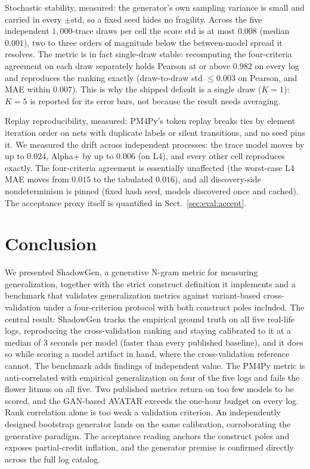 \documentclass[runningheads]{llncs}
\begin{document}
Stochastic stability, measured: the generator's own sampling variance is small and carried in every $\pm$std, so a fixed seed hides no fragility. Across the five independent $1{,}000$-trace draws per cell the score std is at most $0.008$ (median $0.001$), two to three orders of magnitude below the between-model spread it resolves. The metric is in fact single-draw stable: recomputing the four-criteria agreement on each draw separately holds Pearson at or above $0.982$ on every log and reproduces the ranking exactly (draw-to-draw std $\le0.003$ on Pearson, and MAE within $0.007$). This is why the shipped default is a single draw ($K{=}1$): $K{=}5$ is reported for its error bars, not because the result needs averaging.

Replay reproducibility, measured: PM4Py's token replay breaks ties by element iteration order on nets with duplicate labels or silent transitions, and no seed pins it. We measured the drift across independent processes: the trace model moves by up to $0.024$, Alpha+ by up to $0.006$ (on L4), and every other cell reproduces exactly. The four-criteria agreement is essentially unaffected (the worst-case L4 MAE moves from $0.015$ to the tabulated $0.016$), and all discovery-side nondeterminism is pinned (fixed hash seed, models discovered once and cached). The acceptance proxy itself is quantified in Sect.~\ref{sec:eval:accept}.

\section{Conclusion}
\label{sec:conclusion}

We presented ShadowGen, a generative N-gram metric for measuring generalization, together with the strict construct definition it implements and a benchmark that validates generalization metrics against variant-based cross-validation under a four-criterion protocol with both construct poles included. The central result: ShadowGen tracks the empirical ground truth on all five real-life logs, reproducing the cross-validation ranking and staying calibrated to it at a median of $3$ seconds per model (faster than every published baseline), and it does so while scoring a model artifact in hand, where the cross-validation reference cannot. The benchmark adds findings of independent value. The PM4Py metric is anti-correlated with empirical generalization on four of the five logs and fails the flower litmus on all five. Two published metrics return on too few models to be scored, and the GAN-based AVATAR exceeds the one-hour budget on every log. Rank correlation alone is too weak a validation criterion. An independently designed bootstrap generator lands on the same calibration, corroborating the generative paradigm. The acceptance reading anchors the construct poles and exposes partial-credit inflation, and the generator premise is confirmed directly across the full log catalog.
\end{document}
